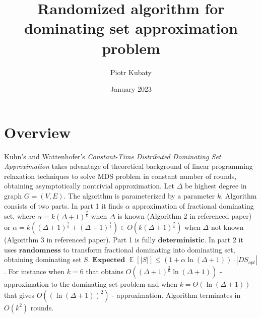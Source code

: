 \documentclass{article}
\author{Piotr Kubaty}
\date{January 2023}
\title{Randomized algorithm for dominating set approximation problem}
\DeclareMathOperator{\EX}{\mathbb{E}}%
\begin{document}
\maketitle
\section{Overview}
Kuhn's and Wattenhofer's \textit{Constant-Time Distributed Dominating Set Approximation} takes advantage of theoretical background of linear programming relaxation techniques to solve MDS problem in constant number of rounds, obtaining asymptotically nontrivial approximation. Let $\Delta$ be highest degree in graph $G = (V,E)$. The algorithm is parameterized by a parameter $k$. Algorithm consists of two parts. In part 1 it finds $\alpha$ approximation of fractional dominating set, where $\alpha = k(\Delta + 1)^\frac{2}{k}$ when $\Delta$ is known (Algorithm 2 in referenced paper) or $\alpha = k((\Delta + 1)^\frac{2}{k} + (\Delta + 1)^\frac{1}{k}) \in O(k(\Delta + 1)^\frac{2}{k})$ when $\Delta$ not known (Algorithm 3 in referenced paper). Part 1 is fully $\textbf{deterministic}$. In part 2 it uses $\textbf{randomness}$ to transform fractional dominating into dominating set, obtaining dominating set $S$. $\textbf{Expected}$ $\EX{[|S|]} \leq (1 + \alpha\ln(\Delta + 1)) \cdot |DS_{opt}|$.
\newline For instance when $k = 6$ that obtains $O((\Delta + 1)^{\frac{2}{6}}\ln{(\Delta + 1)})$ - approximation to the dominating set problem and when $k = \Theta(\ln{(\Delta+1)})$ that gives $O((\ln{(\Delta + 1)})^2)$ - approximation. Algorithm terminates in $O(k^2)$ rounds.
\end{document}
